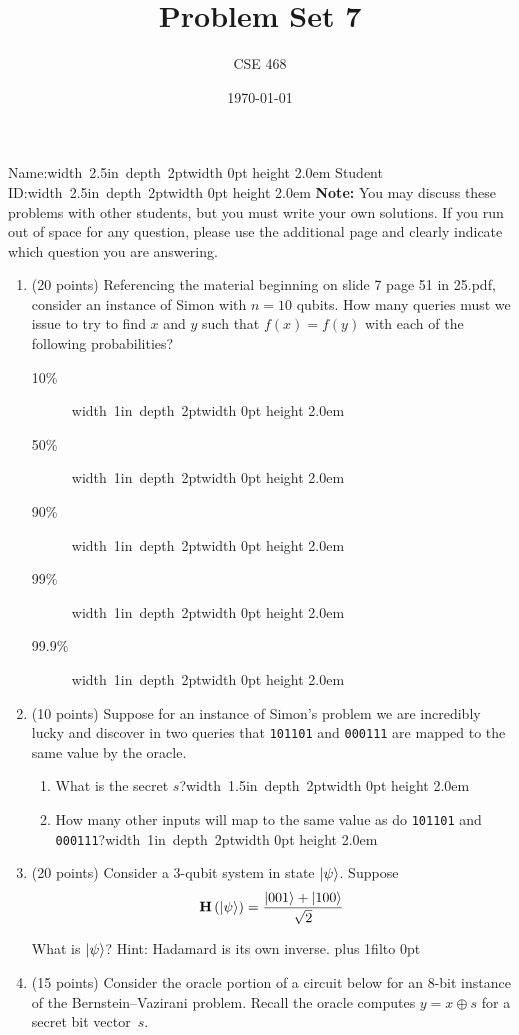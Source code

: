 \documentclass[12pt]{article}
\title{Problem Set 7}
\author{CSE 468}
\date{\today}
\newcommand{\Blank}[1][1in]{\mbox{\hskip 4pt\vrule width #1 depth 2pt}\vrule width 0pt height 2.0em}
\newcommand{\NameBlank}{\mbox{\hskip 4pt\vrule width 2.5in depth 2pt}\vrule width 0pt height 2.0em}
\def\DefaultSpace{1in}
\newcommand{\LeaveSpace}[1][\DefaultSpace]{%
\vskip #1 plus 1fil\relax\hbox to 0pt{\hss} %
}
\begin{document}
\maketitle

\noindent Name:\NameBlank{} \newline
\noindent Student ID:\NameBlank{} \newline
\textbf{Note:} You may discuss these problems with other students, but you must write your own solutions. If you run out of space for any question, please use the additional page and clearly indicate which question you are answering.

\begin{enumerate}[font=\bfseries]

\item (20 points) Referencing the material beginning on slide 7 page 51 in 25.pdf, consider an instance of Simon with $n=10$ qubits.  How many queries must we issue to try to find $x$ and $y$ such that $f(x)=f(y)$ with each of the following probabilities?
\begin{description}
    \item[10\%] \Blank{}
    \item[50\%] \Blank{}
    \item[90\%] \Blank{}
    \item[99\%] \Blank{}
    \item[99.9\%] \Blank{}
\end{description}
\item(10 points) Suppose for an instance of Simon's problem we are incredibly lucky and discover in two queries that \texttt{101101} and \texttt{000111} are mapped to the same value by the oracle.  \begin{enumerate}
    \item What is the secret $s$?\Blank[1.5in]{}
    \item How many other inputs will map to the same value as do \texttt{101101} and \texttt{000111}?\Blank{}
\end{enumerate}

\item (20 points) Consider a 3-qubit system in state $\ket{\psi}$.  Suppose \[ \textbf{H}\left(\ket{\psi}\right)=\frac{\ket{001}+\ket{100}}{\sqrt{2}}\] 

What is $\ket{\psi}$? 
Hint: Hadamard is its own inverse.
\LeaveSpace{}

    \item (15 points) Consider the oracle portion of a circuit below for an $8$-bit instance of the Bernstein--Vazirani problem.  Recall the oracle computes $y=x\oplus s$ for a secret bit vector~$s$.
    

\end{enumerate}
\end{document}

